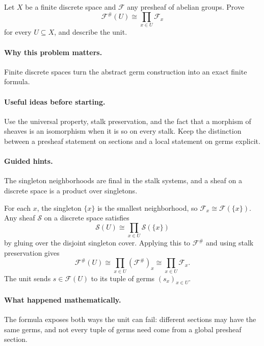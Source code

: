 \begin{problem}
Let $X$ be a finite discrete space and $\mathcal F$ any presheaf of abelian groups. Prove
\[
\mathcal F^\#(U)\cong\prod_{x\in U}\mathcal F_x
\]
for every $U\subseteq X$, and describe the unit.
\end{problem}

\paragraph{Why this problem matters.}
Finite discrete spaces turn the abstract germ construction into an exact finite formula.

\paragraph{Useful ideas before starting.}
Use the universal property, stalk preservation, and the fact that a morphism of sheaves is an isomorphism when it is so on every stalk.  Keep the distinction between a presheaf statement on sections and a local statement on germs explicit.

\paragraph{Guided hints.}
The singleton neighborhoods are final in the stalk systems, and a sheaf on a discrete space is a product over singletons.

\ifdefined\FullProblemDossiers
\begin{solution}
For each $x$, the singleton $\{x\}$ is the smallest neighborhood, so $\mathcal F_x\cong\mathcal F(\{x\})$. Any sheaf $\mathcal S$ on a discrete space satisfies
\[
\mathcal S(U)\cong\prod_{x\in U}\mathcal S(\{x\})
\]
by gluing over the disjoint singleton cover. Applying this to $\mathcal F^\#$ and using stalk preservation gives
\[
\mathcal F^\#(U)\cong\prod_{x\in U}(\mathcal F^\#)_x\cong\prod_{x\in U}\mathcal F_x.
\]
The unit sends $s\in\mathcal F(U)$ to its tuple of germs $(s_x)_{x\in U}$.
\end{solution}

\paragraph{What happened mathematically.}
The formula exposes both ways the unit can fail: different sections may have the same germs, and not every tuple of germs need come from a global presheaf section.

